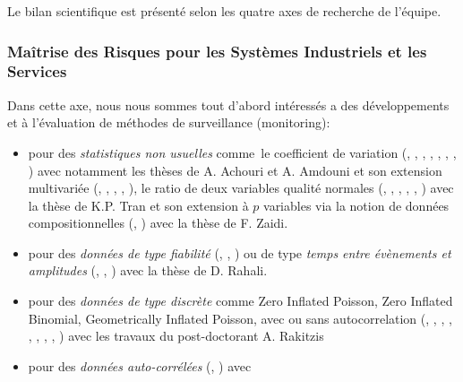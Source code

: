 Le bilan scientifique est présenté selon les quatre axes de recherche de l'équipe. 		

\subsubsection{Maîtrise des Risques pour les Systèmes Industriels et les Services}

Dans cette axe, nous nous sommes tout d'abord intéressés a des
développements et à l'évaluation de méthodes de surveillance
(monitoring):
\begin{itemize}
\item pour des \emph{statistiques non usuelles} comme le coefficient
  de variation (\cite{yeong:hal-01716541},
  \cite{amdouni:hal-01573597}, \cite{you:hal-01351488},
  \cite{teoh:hal-01381673}, \cite{amdouni:hal-01388503},
  \cite{castagliola:hal-01083082}, \cite{castagliola:hal-01202423},
  \cite{amdouni:hal-01202424}) avec notamment les thèses de A. Achouri
  et A. Amdouni et son extension multivariée
  (\cite{khatun:hal-02072237}, \cite{nguyen:hal-01885435},
  \cite{ginerbosch:hal-02283481}, \cite{khaw:hal-01895172},
  \cite{yeong:hal-01307037}), le ratio de deux variables qualité
  normales (\cite{tran:hal-01773342}, \cite{celano:hal-01264243},
  \cite{celano:hal-01272650}, \cite{tran:hal-01308072},
  \cite{tran:hal-01345854}, \cite{tran:hal-01396009}) avec la thèse de
  K.P. Tran et son extension à $p$ variables via la notion de données
  compositionnelles (\cite{zaidi:hal-02273060},
  \cite{tran:hal-01731361}) avec la thèse de F. Zaidi.
\item pour des \emph{données de type fiabilité}
  (\cite{haghighi:hal-02183425}, \cite{castagliola:hal-01204508},
  \cite{haghighi:hal-01264248}) ou de type \emph{temps entre
    évènements et amplitudes} (\cite{rahali:hal-02135093},
  \cite{qu:hal-01809531}, \cite{qu:hal-01895010}) avec la thèse de
  D. Rahali.
\item pour des \emph{données de type discrète} comme Zero Inflated
  Poisson, Zero Inflated Binomial, Geometrically Inflated Poisson,
  avec ou sans autocorrelation (\cite{rakitzis:hal-01718089},
  \cite{rakitzis:hal-01466793}, \cite{rakitzis:hal-01659129},
  \cite{bersimis:hal-01676808}, \cite{rakitzis:hal-01231367},
  \cite{rakitzis:hal-01331381}, \cite{rakitzis:hal-01345886},
  \cite{rakitzis:hal-01345887}, \cite{rakitzis:hal-01166916}) avec les
  travaux du post-doctorant A. Rakitzis
\item pour des \emph{données auto-corrélées}
  (\cite{garzavenegas:hal-01824643}, \cite{franco:hal-01169579}) avec

\end{itemize}
